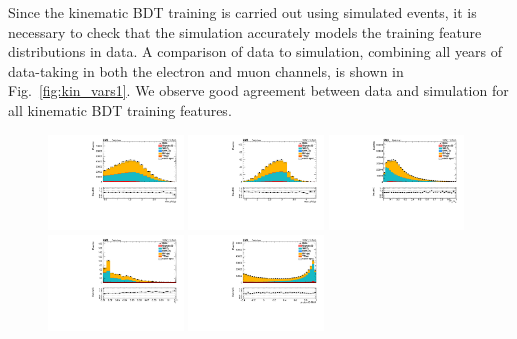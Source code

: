 Since the kinematic BDT training is carried out using simulated events, it is necessary to check that the simulation accurately models the training feature distributions in data. 
A comparison of data to simulation, combining all years of data-taking in both the electron and muon channels, is shown in Fig.~\ref{fig:kin_vars1}. We observe good agreement between
data and simulation for all kinematic BDT training features. 

\begin{figure}[tb]
	\begin{center}
		\includegraphics[width=0.32\textwidth]{fig/MVA/sc_all_kin_dRlg1_valid_ptwei_cat0.pdf}
		\includegraphics[width=0.32\textwidth]{fig/MVA/sc_all_kin_dRlg2_valid_ptwei_cat0.pdf}
		\includegraphics[width=0.32\textwidth]{fig/MVA/sc_all_kin_mllgmllgpt_valid_ptwei_cat0.pdf}\\
		\includegraphics[width=0.32\textwidth]{fig/MVA/sc_all_kin_phores_valid_ptwei_cat0.pdf}
		\includegraphics[width=0.32\textwidth]{fig/MVA/sc_all_kin_phomva_valid_ptwei_EB_cat0.pdf}

\end{center}
\end{figure}
